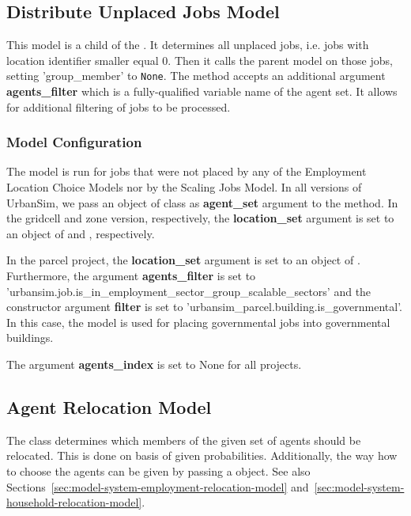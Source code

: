 \subsection{Distribute Unplaced Jobs Model}
%
\label{sec:distribute-unplaced-jobs-model} 
%
This model is a child of the . It determines all unplaced jobs, i.e.
 jobs with location identifier smaller equal 0. Then it calls the parent model on those jobs, setting 
 'group_member' to \verb|None|. The  method accepts an additional argument 
 {\bf agents_filter} which is a fully-qualified variable name of the agent set. It allows for additional filtering 
 of jobs to be processed.

\subsubsection{Model Configuration}
% 
The model is run for jobs that were not placed by 
any of the Employment Location Choice Models nor by the Scaling Jobs Model. 
In all versions of UrbanSim, we pass an object of class  as {\bf agent_set} 
argument to the  method. In the gridcell and zone version, respectively, the {\bf location_set} argument 
is set to an object of  and , respectively.

In the parcel project, the {\bf location_set} argument is set to an object of . 
Furthermore, the argument {\bf agents_filter} is set to 'urbansim.job.is_in_employment_sector_group_scalable_sectors' 
and the constructor argument {\bf filter} is set to 'urbansim_parcel.building.is_governmental'. In this case, the model
is used for placing governmental jobs into governmental buildings.

The argument {\bf agents_index} is set to None for all projects. 


%
\subsection{Agent Relocation Model}
%
\label{sec:agent-relocation-model}

The class  
determines which members of the given
set of agents should be relocated. This is done on basis of given
probabilities. Additionally, the way how to choose the agents can be given by
passing a  object. See also Sections~\ref{sec:model-system-employment-relocation-model} 
and~\ref{sec:model-system-household-relocation-model}.


